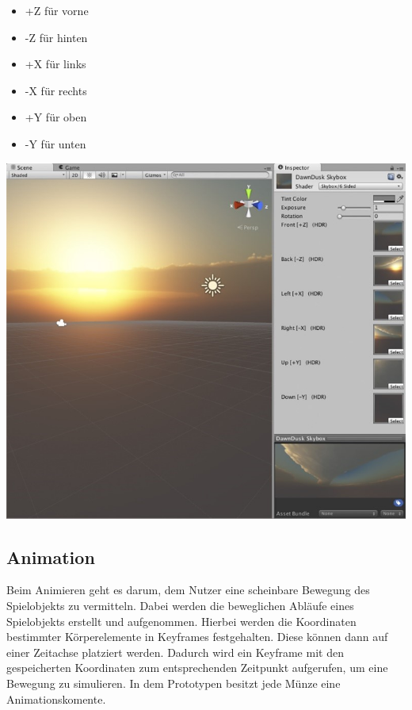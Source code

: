 \begin{minipage}{0.4\textwidth}
    \begin{itemize}
        \item +Z für vorne 
        \item -Z für hinten 
        \item +X für links 
        \item -X für rechts
        \item +Y für oben
        \item -Y für unten
    \end{itemize}
  \end{minipage}
  \hfill
  \begin{minipage}{0.6\textwidth}
    \includegraphics[width=\linewidth]{chapters/14/Images/Skybox.png}
  \end{minipage}

\pagebreak
\subsection{Animation}

Beim Animieren geht es darum, dem Nutzer eine scheinbare Bewegung des Spielobjekts zu vermitteln. Dabei werden die beweglichen Abläufe eines Spielobjekts erstellt und aufgenommen. Hierbei werden die Koordinaten bestimmter Körperelemente in Keyframes festgehalten. Diese können dann auf einer Zeitachse platziert werden. Dadurch wird ein Keyframe mit den gespeicherten Koordinaten zum entsprechenden Zeitpunkt aufgerufen, um eine Bewegung zu simulieren. In dem Prototypen besitzt jede Münze eine Animationskomente.

